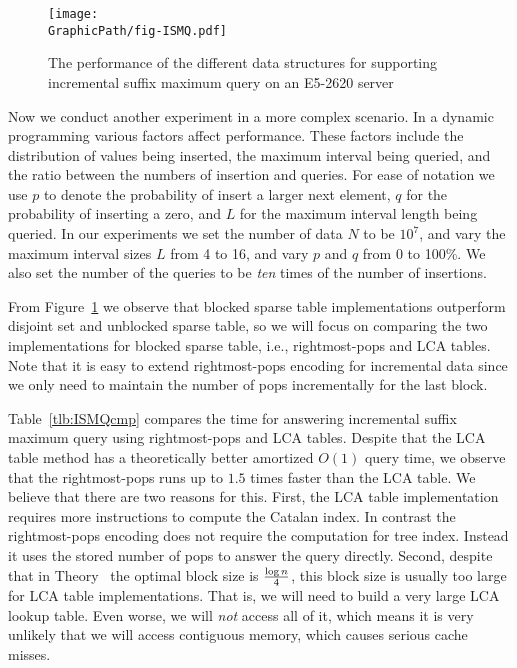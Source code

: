 \begin{figure}[!thb]
  \centering
  \texttt{[image: \\GraphicPath/fig-ISMQ.pdf]}
  \caption{The performance of the different data structures for
    supporting incremental suffix maximum query on an E5-2620 server}
  \label{fig:fig-ISMQcmp}
\end{figure}

Now we conduct another experiment in a more complex scenario.  In a
dynamic programming various factors affect performance.  These factors
include the distribution of values being inserted, the maximum
interval being queried, and the ratio between the numbers of insertion
and queries.  For ease of notation we use $p$ to denote the
probability of insert a larger next element, $q$ for the probability
of inserting a zero, and $L$ for the maximum interval length being
queried.  In our experiments we set the number of data $N$ to be
$10^7$, and vary the maximum interval sizes $L$ from 4 to 16, and vary
$p$ and $q$ from 0 to 100\%.  We also set the number of the queries to
be {\em ten} times of the number of insertions.

From Figure~\ref{fig:fig-ISMQcmp} we observe that blocked sparse table
implementations outperform disjoint set and unblocked sparse table, so
we will focus on comparing the two implementations for blocked sparse
table, i.e., rightmost-pops and LCA tables.  Note that it is easy to
extend rightmost-pops encoding for incremental data since we only need
to maintain the number of pops incrementally for the last block.

Table~\ref{tlb:ISMQcmp} compares the time for answering incremental
suffix maximum query using rightmost-pops and LCA tables.  Despite
that the LCA table method has a theoretically better amortized $O(1)$
query time, we observe that the rightmost-pops runs up to $1.5$ times
faster than the LCA table.  We believe that there are two reasons for
this.  First, the LCA table implementation requires more instructions
to compute the Catalan index.  In contrast the rightmost-pops
encoding does not require the computation for tree index.  Instead it
uses the stored number of pops to answer the query directly.  Second,
despite that in Theory~\cite{Fischer2006TheoreticalAP} the optimal
block size is ${\log n}\over{4}$, this block size is usually too large
for LCA table implementations.  That is, we will need to build a very
large LCA lookup table.  Even worse, we will {\em not} access all of
it, which means it is very unlikely that we will access contiguous
memory, which causes serious cache misses.


